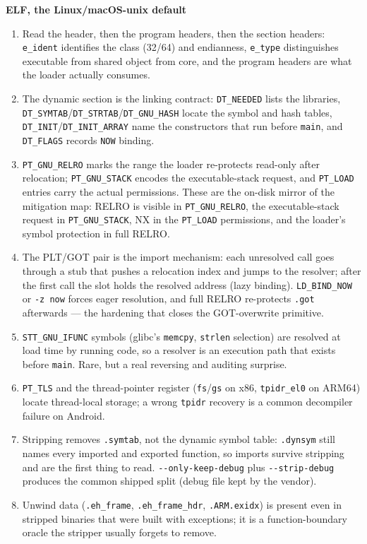 \documentclass[12pt]{Training}
\begin{document}
\textbf{ELF, the Linux/macOS-unix default}
\begin{enumerate}
    \item Read the header, then the program headers, then the section headers: \lstinline{e_ident} identifies the class (32/64) and endianness, \lstinline{e_type} distinguishes executable from shared object from core, and the program headers are what the loader actually consumes.
    \item The dynamic section is the linking contract: \lstinline{DT_NEEDED} lists the libraries, \lstinline{DT_SYMTAB}/\lstinline{DT_STRTAB}/\lstinline{DT_GNU_HASH} locate the symbol and hash tables, \lstinline{DT_INIT}/\lstinline{DT_INIT_ARRAY} name the constructors that run before \lstinline{main}, and \lstinline{DT_FLAGS} records \lstinline{NOW} binding.
    \item \lstinline{PT_GNU_RELRO} marks the range the loader re-protects read-only after relocation; \lstinline{PT_GNU_STACK} encodes the executable-stack request, and \lstinline{PT_LOAD} entries carry the actual permissions. These are the on-disk mirror of the mitigation map: RELRO is visible in \lstinline{PT_GNU_RELRO}, the executable-stack request in \lstinline{PT_GNU_STACK}, NX in the \lstinline{PT_LOAD} permissions, and the loader's symbol protection in full RELRO.
    \item The PLT/GOT pair is the import mechanism: each unresolved call goes through a stub that pushes a relocation index and jumps to the resolver; after the first call the slot holds the resolved address (lazy binding). \lstinline{LD_BIND_NOW} or \lstinline{-z now} forces eager resolution, and full RELRO re-protects \lstinline{.got} afterwards --- the hardening that closes the GOT-overwrite primitive.
    \item \lstinline{STT_GNU_IFUNC} symbols (glibc's \lstinline{memcpy}, \lstinline{strlen} selection) are resolved at load time by running code, so a resolver is an execution path that exists before \lstinline{main}. Rare, but a real reversing and auditing surprise.
    \item \lstinline{PT_TLS} and the thread-pointer register (\lstinline{fs}/\lstinline{gs} on x86, \lstinline{tpidr_el0} on ARM64) locate thread-local storage; a wrong \lstinline{tpidr} recovery is a common decompiler failure on Android.
    \item Stripping removes \lstinline{.symtab}, not the dynamic symbol table: \lstinline{.dynsym} still names every imported and exported function, so imports survive stripping and are the first thing to read. \lstinline{--only-keep-debug} plus \lstinline{--strip-debug} produces the common shipped split (debug file kept by the vendor).
    \item Unwind data (\lstinline{.eh_frame}, \lstinline{.eh_frame_hdr}, \lstinline{.ARM.exidx}) is present even in stripped binaries that were built with exceptions; it is a function-boundary oracle the stripper usually forgets to remove.
\end{enumerate}
\end{document}
